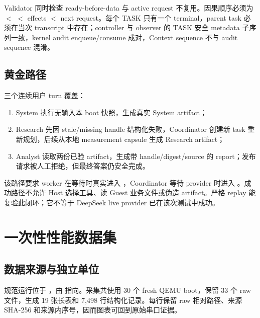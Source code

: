 Validator 同时检查 ready-before-data 与 active request 不复用。因果顺序必须为  $<$  $<$ effects $<$ next request。每个 TASK 只有一个 terminal，parent task 必须在当次 transcript 中存在；controller 与 observer 的 TASK 安全 metadata 子序列一致，kernel audit enqueue/consume 成对，Context sequence 不与 audit sequence 混淆。

\subsection{黄金路径}

三个连续用户 turn 覆盖：

\begin{enumerate}
  \item System 执行无输入本 boot 快照，生成真实 System artifact；
  \item Research 先因 stale/missing handle 结构化失败，Coordinator 创建新 task 重新规划，后续从本地 measurement capsule 生成 Research artifact；
  \item Analyst 读取两份已验 artifact，生成带 handle/digest/source 的 report；发布请求被人工拒绝，但最终答案仍安全完成。
\end{enumerate}

该路径要求 worker 在等待时真实进入 ，Coordinator 等待 provider 时进入 。成功路径不允许 Host 选择工具、读 Guest 业务文件或伪造 artifact。严格 replay 能复验此闭环；它不等于 DeepSeek live provider 已在该次测试中成功。

\section{一次性性能数据集}

\subsection{数据来源与独立单位}

规范运行位于 ，由  指向。采集共使用 30 个 fresh QEMU boot，保留 33 个 raw 文件，生成 19 张长表和 7,498 行结构化记录。每行保留 raw 相对路径、来源 SHA-256 和来源内序号，因而图表可回到原始串口证据。

